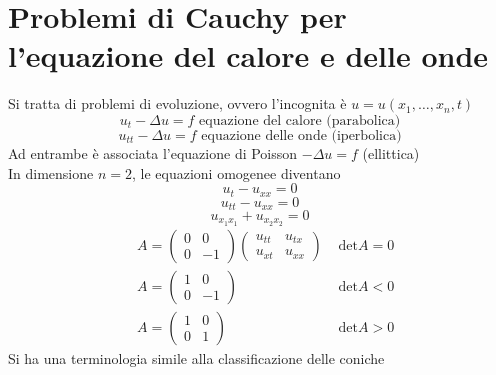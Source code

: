 \documentclass[a4paper]{article}
\begin{document}
\section{Problemi di Cauchy per l'equazione del calore e delle onde}
Si tratta di problemi di evoluzione, ovvero l'incognita è $u=u(x_1,\ldots,x_{n},t)$ 
\[u_t-\Delta u = f \text{ equazione del calore (parabolica)}\]
\[u_{t t}-\Delta u = f \text{ equazione delle onde (iperbolica)}\]
Ad entrambe è associata l'equazione di Poisson $-\Delta u = f $ (ellittica)
\\In dimensione $n=2$, le equazioni omogenee diventano
\[u_t-u_{x x}=0\]
\[u_{t t}-u_{x x}=0\]
\[u_{x_1x_1}+u_{x_2x_2}=0\]
\begin{align*}
&A=\begin{pmatrix} 0&0\\0&-1 \end{pmatrix} \begin{pmatrix} u_{t t}&u_{tx}\\u_{x t}&u_{x x} \end{pmatrix} &\text{ det}A = 0\\
&A= \begin{pmatrix} 1&0\\0&-1 \end{pmatrix} &\text{ det}A<0\\
&A= \begin{pmatrix} 1 & 0\\0 & 1 \end{pmatrix} &\text{ det}A>0
\end{align*}
Si ha una terminologia simile alla classificazione delle coniche
\end{document}
